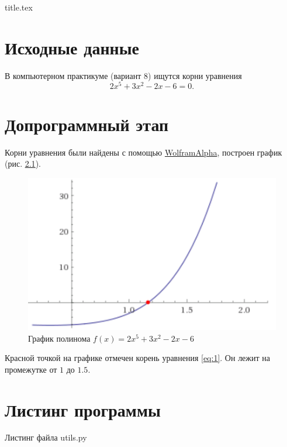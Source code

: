 




{title.tex}

\clearpage



\clearpage
{}
\pagestyle{fancy}
\setcounter{page}{2}

\clearpage

\chapter{Исходные данные}

В компьютерном практикуме (вариант 8) ищутся корни уравнения
\begin{equation} \label{eq:1}
2x^5 + 3x^2 - 2x - 6 = 0.
\end{equation}

\chapter{Допрограммный этап}

Корни уравнения были найдены с помощью \href{http://www.wolframalpha.com}{WolframAlpha}, построен график (рис. \ref{fig:plot}).

\begin{figure}[h!]
  \centering
  \includegraphics[width=.3\textwidth]{plot.png}
  \caption{График полинома $f \left( x \right) = 2x^5 + 3x^2 - 2x - 6$}
\label{fig:plot}
\end{figure}

Красной точкой на графике отмечен корень уравнения \ref{eq:1}.
Он лежит на промежутке от $1$ до $1.5$.

\chapter{Листинг программы}

Листинг файла utils.py
\lstset{inputencoding=utf8, extendedchars=\true}


